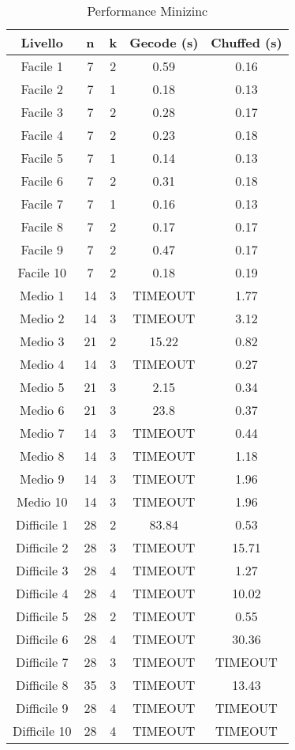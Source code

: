\documentclass{article}
\begin{document}
\begin{multicols*}{2}
\begin{table}[H]
    \centering
    \caption{Performance Minizinc}\label{tab:minizinc}
    \begin{tabular}{|c|c|c|c|c|}
        \hline
        \textbf{Livello} & \textbf{n} & \textbf{k} & \textbf{Gecode (s)} & \textbf{Chuffed (s)} \\
        \hline
        Facile 1 & 7 & 2 & 0.59 & 0.16 \\
        Facile 2 & 7 & 1 & 0.18 & 0.13 \\
        Facile 3 & 7 & 2 & 0.28 & 0.17 \\
        Facile 4 & 7 & 2 & 0.23 & 0.18 \\
        Facile 5 & 7 & 1 & 0.14 & 0.13 \\
        Facile 6 & 7 & 2 & 0.31 & 0.18 \\
        Facile 7 & 7 & 1 & 0.16 & 0.13 \\
        Facile 8 & 7 & 2 & 0.17 & 0.17 \\
        Facile 9 & 7 & 2 & 0.47 & 0.17 \\
        Facile 10 & 7 & 2 & 0.18 & 0.19 \\
        \hline
        Medio 1 & 14 & 3 & TIMEOUT & 1.77 \\
        Medio 2 & 14 & 3 & TIMEOUT & 3.12 \\
        Medio 3 & 21 & 2 & 15.22 & 0.82 \\
        Medio 4 & 14 & 3 & TIMEOUT & 0.27 \\
        Medio 5 & 21 & 3 & 2.15 & 0.34 \\
        Medio 6 & 21 & 3 & 23.8 & 0.37 \\
        Medio 7 & 14 & 3 & TIMEOUT & 0.44 \\
        Medio 8 & 14 & 3 & TIMEOUT & 1.18 \\
        Medio 9 & 14 & 3 & TIMEOUT & 1.96 \\
        Medio 10 & 14 & 3 & TIMEOUT & 1.96 \\
        \hline
        Difficile 1 & 28 & 2 & 83.84 & 0.53 \\
        Difficile 2 & 28 & 3 & TIMEOUT & 15.71 \\
        Difficile 3 & 28 & 4 & TIMEOUT & 1.27 \\
        Difficile 4 & 28 & 4 & TIMEOUT & 10.02 \\
        Difficile 5 & 28 & 2 & TIMEOUT & 0.55 \\
        Difficile 6 & 28 & 4 & TIMEOUT & 30.36 \\
        Difficile 7 & 28 & 3 & TIMEOUT & TIMEOUT \\
        Difficile 8 & 35 & 3 & TIMEOUT & 13.43 \\
        Difficile 9 & 28 & 4 & TIMEOUT & TIMEOUT \\
        Difficile 10 & 28 & 4 & TIMEOUT & TIMEOUT \\
        \hline
    \end{tabular}
\end{table}
\end{multicols*}
\end{document}
